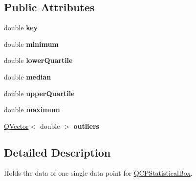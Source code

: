 \subsection*{Public Attributes}
\begin{DoxyCompactItemize}
\item 
double {\bfseries key}\hypertarget{class_q_c_p_statistical_box_data_a2d0b5ca5130e8a73294c46b8b2fd77b8}{}\label{class_q_c_p_statistical_box_data_a2d0b5ca5130e8a73294c46b8b2fd77b8}

\item 
double {\bfseries minimum}\hypertarget{class_q_c_p_statistical_box_data_adc2f4b8cbff9f2e4a676f32bad8a7e3a}{}\label{class_q_c_p_statistical_box_data_adc2f4b8cbff9f2e4a676f32bad8a7e3a}

\item 
double {\bfseries lower\+Quartile}\hypertarget{class_q_c_p_statistical_box_data_af9f478b4ea0789fa6cff7eebb654b5d4}{}\label{class_q_c_p_statistical_box_data_af9f478b4ea0789fa6cff7eebb654b5d4}

\item 
double {\bfseries median}\hypertarget{class_q_c_p_statistical_box_data_a116cd53ae6685979ec3b051cfc7dbba5}{}\label{class_q_c_p_statistical_box_data_a116cd53ae6685979ec3b051cfc7dbba5}

\item 
double {\bfseries upper\+Quartile}\hypertarget{class_q_c_p_statistical_box_data_a5604dfe04b103e5ac73ce7895b46303b}{}\label{class_q_c_p_statistical_box_data_a5604dfe04b103e5ac73ce7895b46303b}

\item 
double {\bfseries maximum}\hypertarget{class_q_c_p_statistical_box_data_aa2800abda337decfc4277cb8bf846d6f}{}\label{class_q_c_p_statistical_box_data_aa2800abda337decfc4277cb8bf846d6f}

\item 
\hyperlink{class_q_vector}{Q\+Vector}$<$ double $>$ {\bfseries outliers}\hypertarget{class_q_c_p_statistical_box_data_aaf0f7d4616b881a341fdcb8b1d122e65}{}\label{class_q_c_p_statistical_box_data_aaf0f7d4616b881a341fdcb8b1d122e65}

\end{DoxyCompactItemize}


\subsection{Detailed Description}
Holds the data of one single data point for \hyperlink{class_q_c_p_statistical_box}{Q\+C\+P\+Statistical\+Box}. 

